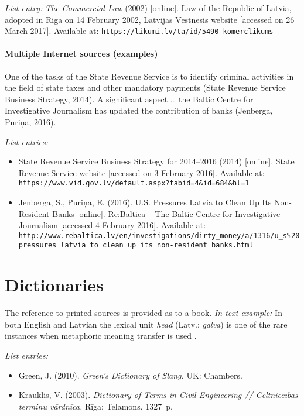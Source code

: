 \emph{List entry:} \emph{The Commercial Law} (2002) [online]. Law of the Republic of Latvia, adopted in Riga on 14 February 2002, Latvijas Vēstnesis website [accessed on 26 March 2017]. Available at: \verb|https://likumi.lv/ta/id/5490-komerclikums|

\paragraph{Multiple Internet sources (examples)} One of the tasks of the State Revenue Service is to identify criminal activities in the field of state taxes and other mandatory payments (State Revenue Service Business Strategy, 2014). A significant aspect \dots{} the Baltic Centre for Investigative Journalism has updated the contribution of banks (Jenberga, Puriņa, 2016).

\emph{List entries:}
\begin{itemize}
  \item State Revenue Service Business Strategy for 2014--2016 (2014) [online]. State Revenue Service website [accessed on 3 February 2016]. Available at: \verb|https://www.vid.gov.lv/default.aspx?tabid=4&id=684&hl=1|
  \item Jenberga, S., Puriņa, E. (2016). U.S. Pressures Latvia to Clean Up Its Non-Resident Banks [online]. Re:Baltica -- The Baltic Centre for Investigative Journalism [accessed 4 February 2016]. Available at: \verb|http://www.rebaltica.lv/en/investigations/dirty_money/a/1316/u_s%20pressures_latvia_to_clean_up_its_non-resident_banks.html|
\end{itemize}

\section{Dictionaries}

The reference to printed sources is provided as to a book. \emph{In-text example:} In both English and Latvian the lexical unit \emph{head} (Latv.: \emph{galva}) is one of the rare instances when metaphoric meaning transfer is used \parencite[582]{krauklis2003}.

\emph{List entries:}
\begin{itemize}
  \item Green, J. (2010). \emph{Green's Dictionary of Slang.} UK: Chambers.
  \item Krauklis, V. (2003). \emph{Dictionary of Terms in Civil Engineering // Celtniecības terminu vārdnīca.} Rīga: Telamons. 1327~p.
\end{itemize}

